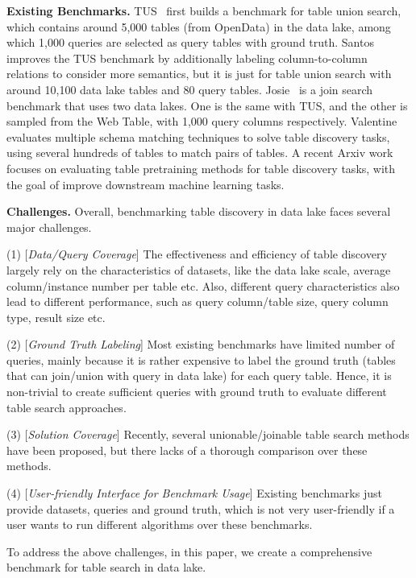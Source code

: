 \noindent \textbf{Existing Benchmarks.}  
TUS~\cite{TUS} first builds a benchmark for table union search, which contains around 5,000 tables (from OpenData) in the data lake, among which 1,000 queries are selected as query tables with ground truth. 
Santos~\cite{Santos} improves the TUS benchmark by additionally labeling column-to-column relations to consider more semantics, but it is just for table union search with around 10,100 data lake tables and 80 query tables.
Josie~\cite{Josie} is a join search benchmark that uses two data lakes. One is the same with TUS, and the other is sampled from the Web Table, with 1,000 query columns respectively. 
Valentine~\cite{valentine} evaluates multiple schema matching techniques to solve table discovery tasks, using several hundreds of tables to match pairs of tables. A recent Arxiv work~\cite{arxiv} focuses on evaluating table pretraining methods for table discovery tasks, with the goal of improve downstream machine learning tasks. 

\noindent \textbf{Challenges.} Overall, benchmarking table discovery in data lake faces several major challenges.

\noindent (1) [\textit{Data/Query Coverage}] The effectiveness and efficiency of table discovery largely rely on the characteristics of datasets, like the data lake scale, average column/instance number per table etc. Also, different query  characteristics also lead to different performance, such as query column/table size,  query column type,  result size etc. 

\noindent (2) [\textit{Ground Truth Labeling}] 
 Most existing benchmarks have limited number of queries,  mainly because it is rather expensive to label the ground truth (tables  that can join/union with query in data lake) for each query table. Hence, it is non-trivial to create sufficient queries with ground truth to evaluate different table search approaches.

\noindent (3) [\textit{Solution Coverage}] 
Recently, several unionable/joinable table search methods have been proposed, but there lacks of a thorough comparison over these methods.

\noindent (4) [\textit{User-friendly Interface for Benchmark Usage}] Existing benchmarks just provide datasets, queries and ground truth, which is not very user-friendly if a user wants to
run different algorithms over these benchmarks.


To address the above challenges, in this paper, we create a comprehensive benchmark \sys for table search in data lake.

